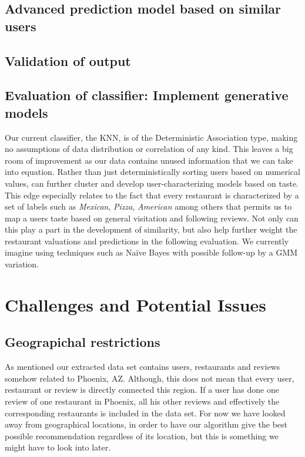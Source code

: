 \documentclass[10pt,twocolumn,letterpaper]{article}
\begin{document}
\subsection{Advanced prediction model based on similar users}

\subsection{Validation of output}

\subsection{Evaluation of classifier: Implement generative models}
Our current classifier, the KNN, is of the Deterministic Association type, making no assumptions of data distribution or correlation of any kind. This leaves a big room of improvement as our data contains unused information that we can take into equation. Rather than just deterministically sorting users based on numerical values, can further cluster and develop user-characterizing models based on taste. This edge especially relates to the fact that every restaurant is characterized by a set of labels such as \textit{Mexican}, \textit{Pizza}, \textit{American} among others that permits us to map a users taste based on general visitation and following reviews. Not only can this play a part in the development of similarity, but also help further weight the restaurant valuations and predictions in the following evaluation. We currently imagine using techniques such as Naïve Bayes with possible follow-up by a GMM variation.

\section{Challenges and Potential Issues}
\subsection{Geograpichal restrictions}
As mentioned our extracted data set contains users, restaurants and reviews somehow related to Phoenix, AZ. Although, this does not mean that every user, restaurant or review is directly connected this region. If a user has done one review of one restaurant in Phoenix, all his other reviews and effectively the corresponding restaurants is included in the data set. For now we have looked away from geographical locations, in order to have our algorithm give the best possible recommendation regardless of its location, but this is something we might have to look into later.

{\small

}
\end{document}
